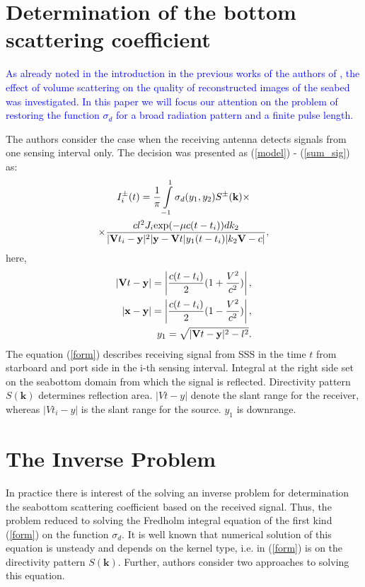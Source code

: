 \documentclass{procDDs}
\begin{document}
\section{Determination of the bottom scattering coefficient}


\textcolor{blue}{As already noted in the introduction in the previous works of the authors of \cite{AF2015, SPIE_KOV}, the effect of volume scattering on the quality of reconstructed images of the seabed was investigated. In this paper we will focus our attention on the problem of restoring the  function $\sigma_d$ for a broad radiation pattern and a finite pulse length.}

The authors consider the case when the receiving antenna detects signals from one sensing interval only. The decision was presented as (\ref{model}) - (\ref{sum_sig}) as:
\begin{multline}
	\label{form}
	I^\pm_i(t) = \frac{1}{\pi}\int\limits_{-1}^{1}\sigma_d(y_1,y_2) S^{\pm}(\mathbf{k}) \times \\ \times
	\frac{ cl^2J_i \text{exp}(-\mu c(t-t_i))dk_2}{|\mathbf{V}t_i-\mathbf{y}|^2|\mathbf{y}-\mathbf{V}t|y_1(t-t_i)|k_2 \mathbf{V}-c|},
\end{multline}
here, 
\begin{align*}
	|\mathbf{V}t - \mathbf{y}| = \left|\dfrac{c(t-t_i)}{2}(1+\dfrac{V^2}{c^2})\right|, \\
	|\mathbf{x}-\mathbf{y}| = \left|\dfrac{c(t-t_i)}{2}(1-\dfrac{V^2}{c^2})\right|, \\
	y_1 = \sqrt{|\mathbf{V}t-\mathbf{y}|^2 - l^2}.
\end{align*}
The equation (\ref{form}) describes receiving signal from SSS in the time $t$ from starboard and port side in the i-th sensing interval. Integral at the right side set on the seabottom domain from which the signal is reflected. Directivity pattern $S(\textbf{k})$ determines reflection area. $|Vt-y|$ denote the slant range for the receiver, whereas $|Vt_i-y|$   is the slant range for the source. $y_1$ is downrange.

\section{The Inverse Problem}
In practice there is interest of the solving an inverse problem for determination the seabottom scattering coefficient based on the received signal. Thus, the problem reduced to solving the Fredholm integral equation of the first kind (\ref{form}) on the function $\sigma_d$. It is well known that numerical solution of this equation is unsteady and depends on the kernel type, i.e. in (\ref{form}) is on the directivity pattern $S(\textbf{k})$. Further, authors consider two approaches to solving this equation.
\end{document}
